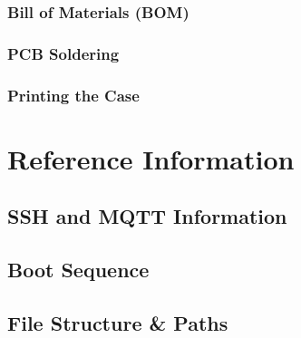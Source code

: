 \documentclass{article}
\begin{document}
\subsubsection{Bill of Materials (BOM)}

\subsubsection{PCB Soldering}

\subsubsection{Printing the Case}


\section{Reference Information}
%
\subsection{SSH and MQTT Information}

\subsection{Boot Sequence}

\subsection{File Structure \& Paths}


\end{document}
